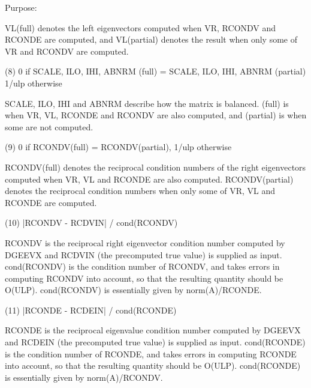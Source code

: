 \begin{DoxyParagraph}{Purpose\+: }
\begin{DoxyVerb}
      VL(full) denotes the left eigenvectors computed when VR, RCONDV
      and RCONDE are computed, and VL(partial) denotes the result
      when only some of VR and RCONDV are computed.

    (8)     0 if SCALE, ILO, IHI, ABNRM (full) =
                 SCALE, ILO, IHI, ABNRM (partial)
            1/ulp otherwise

      SCALE, ILO, IHI and ABNRM describe how the matrix is balanced.
      (full) is when VR, VL, RCONDE and RCONDV are also computed, and
      (partial) is when some are not computed.

    (9)     0 if RCONDV(full) = RCONDV(partial), 1/ulp otherwise

      RCONDV(full) denotes the reciprocal condition numbers of the
      right eigenvectors computed when VR, VL and RCONDE are also
      computed. RCONDV(partial) denotes the reciprocal condition
      numbers when only some of VR, VL and RCONDE are computed.

   (10)     |RCONDV - RCDVIN| / cond(RCONDV)

      RCONDV is the reciprocal right eigenvector condition number
      computed by DGEEVX and RCDVIN (the precomputed true value)
      is supplied as input. cond(RCONDV) is the condition number of
      RCONDV, and takes errors in computing RCONDV into account, so
      that the resulting quantity should be O(ULP). cond(RCONDV) is
      essentially given by norm(A)/RCONDE.

   (11)     |RCONDE - RCDEIN| / cond(RCONDE)

      RCONDE is the reciprocal eigenvalue condition number
      computed by DGEEVX and RCDEIN (the precomputed true value)
      is supplied as input.  cond(RCONDE) is the condition number
      of RCONDE, and takes errors in computing RCONDE into account,
      so that the resulting quantity should be O(ULP). cond(RCONDE)
      is essentially given by norm(A)/RCONDV.\end{DoxyVerb}
 
\end{DoxyParagraph}

